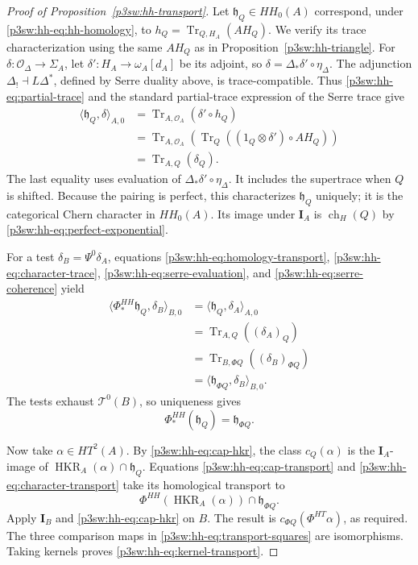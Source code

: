 \documentclass[11pt]{article}
\numberwithin{equation}{section}
\begin{document}
\begin{proof}[Proof of Proposition~\ref{p3sw:hh-transport}]
Let \(\mathfrak h_Q\in HH_0(A)\) correspond, under
\eqref{p3sw:hh-eq:hh-homology}, to
\(h_Q=\operatorname{Tr}_{Q,H_A}(AH_Q)\).
We verify its trace characterization using the same \(AH_Q\) as in
Proposition~\ref{p3sw:hh-triangle}.  For
\(\delta:\mathcal O_\Delta\to\Sigma_A\), let
\(\delta':H_A\to\omega_A[d_A]\) be its adjoint, so
\(\delta=\Delta_*\delta'\circ\eta_\Delta\).
The adjunction \(\Delta_!\dashv L\Delta^*\), defined by Serre
duality above, is trace-compatible.  Thus
\eqref{p3sw:hh-eq:partial-trace} and the standard partial-trace
expression of the Serre trace give
\begin{equation}
\begin{split}
 \langle\mathfrak h_Q,\delta\rangle_{A,0}
  &=\operatorname{Tr}_{A,\mathcal O_A}(\delta'\circ h_Q)\\
  &=\operatorname{Tr}_{A,\mathcal O_A}
       \left(\operatorname{Tr}_Q
              ((1_Q\otimes\delta')\circ AH_Q)\right)\\
  &=\operatorname{Tr}_{A,Q}(\delta_Q).
\end{split}
\label{p3sw:hh-eq:character-trace}
\end{equation}
The last equality uses evaluation of
\(\Delta_*\delta'\circ\eta_\Delta\).  It includes the supertrace
when \(Q\) is shifted.  Because the pairing is perfect, this
characterizes \(\mathfrak h_Q\) uniquely; it is the categorical
Chern character in \(HH_0(A)\).  Its image under \(\mathbf I_A\)
is \(\operatorname{ch}_H(Q)\) by
\eqref{p3sw:hh-eq:perfect-exponential}.

For a test \(\delta_B=\Psi^0\delta_A\), equations
\eqref{p3sw:hh-eq:homology-transport},
\eqref{p3sw:hh-eq:character-trace},
\eqref{p3sw:hh-eq:serre-evaluation}, and
\eqref{p3sw:hh-eq:serre-coherence} yield
\[
\begin{split}
 \langle\Phi_*^{HH}\mathfrak h_Q,\delta_B\rangle_{B,0}
  &=\langle\mathfrak h_Q,\delta_A\rangle_{A,0}\\
  &=\operatorname{Tr}_{A,Q}((\delta_A)_Q)\\
  &=\operatorname{Tr}_{B,\Phi Q}((\delta_B)_{\Phi Q})\\
  &=\langle\mathfrak h_{\Phi Q},\delta_B\rangle_{B,0}.
\end{split}
\]
The tests exhaust \(\mathscr T^0(B)\), so uniqueness gives
\begin{equation}
 \Phi_*^{HH}(\mathfrak h_Q)=\mathfrak h_{\Phi Q}.
\label{p3sw:hh-eq:character-transport}
\end{equation}

Now take \(\alpha\in HT^2(A)\).  By
\eqref{p3sw:hh-eq:cap-hkr}, the class \(c_Q(\alpha)\) is the
\(\mathbf I_A\)-image of
\(\operatorname{HKR}_A(\alpha)\cap\mathfrak h_Q\).
Equations \eqref{p3sw:hh-eq:cap-transport} and
\eqref{p3sw:hh-eq:character-transport} take its homological
transport to
\[
 \Phi^{HH}(\operatorname{HKR}_A(\alpha))
                    \cap\mathfrak h_{\Phi Q}.
\]
Apply \(\mathbf I_B\) and
\eqref{p3sw:hh-eq:cap-hkr} on \(B\).  The result is
\(c_{\Phi Q}(\Phi^{HT}\alpha)\), as required.  The three comparison
maps in \eqref{p3sw:hh-eq:transport-squares} are isomorphisms.
Taking kernels proves \eqref{p3sw:hh-eq:kernel-transport}.
\end{proof}
\end{document}
